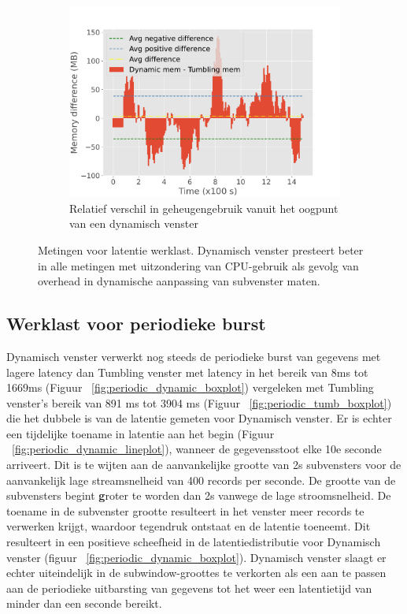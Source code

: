 \begin{figure}[htbp]
    \\
    \begin{subfigure}[b]{\columnwidth}
        \centering
        \includegraphics[width=0.5\columnwidth]{fig/constant-rate/mem_difference_bar.pdf}
        \caption{Relatief verschil in geheugengebruik vanuit het oogpunt van een dynamisch venster}
        \label{fig:constant_mem_diff}
    \end{subfigure}

    \caption[Metriek metingen voor latency werklast.]
    {Metingen voor latentie werklast. Dynamisch venster presteert 
    beter in alle metingen met uitzondering van CPU-gebruik als gevolg van
overhead in dynamische aanpassing van subvenster maten.}%
    \label{fig:constant_measurement}
\end{figure}

\subsection{Werklast voor periodieke burst}%
\label{sec:Results Workload for periodic burst}

Dynamisch venster verwerkt nog steeds de periodieke burst van gegevens met lagere latency 
dan Tumbling venster met latency in het bereik van 8ms tot 1669ms
(Figuur ~\ref{fig:periodic_dynamic_boxplot}) vergeleken met 
Tumbling venster's bereik van 891 ms tot 3904 ms 
(Figuur ~\ref{fig:periodic_tumb_boxplot}) die het dubbele is van de latentie 
gemeten voor Dynamisch venster.
Er is echter een tijdelijke toename in latentie aan het begin 
(Figuur ~\ref{fig:periodic_dynamic_lineplot}), 
wanneer de gegevensstoot elke 10e seconde arriveert. 
Dit is te wijten aan de aanvankelijke grootte van 2s subvensters voor de aanvankelijk lage streamsnelheid van 400 records per seconde. 
De grootte van de subvensters begint \textbf groter te worden dan 2s vanwege de lage stroomsnelheid. 
De toename in de subvenster grootte resulteert in het 
venster meer records te verwerken krijgt, waardoor tegendruk ontstaat en de latentie toeneemt.  
Dit resulteert in een positieve scheefheid in de latentiedistributie voor Dynamisch venster (figuur ~\ref{fig:periodic_dynamic_boxplot}). 
Dynamisch venster slaagt er echter uiteindelijk in de subwindow-groottes te verkorten als een
aan te passen aan de periodieke uitbarsting van gegevens tot het weer een latentietijd van minder dan een seconde bereikt.


